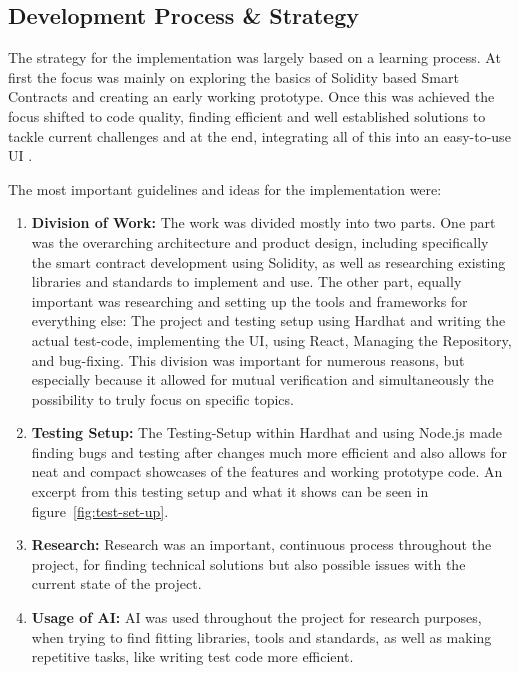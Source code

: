 \documentclass[11pt,a4paper]{article}
\begin{document}
	\subsection{Development Process \& Strategy}\label{subsec:dev-strategy}
	The strategy for the implementation was largely based on a learning process.
	At first the focus was mainly on exploring the basics of Solidity based Smart Contracts and creating an early working prototype.
	Once this was achieved the focus shifted to code quality, finding efficient and well established solutions to tackle current challenges and at the end, integrating all of this into an easy-to-use UI .


	The most important guidelines and ideas for the implementation were:

	\begin{enumerate}[1]
		\item \textbf{Division of Work:} The work was divided mostly into two parts.
			One part was the overarching architecture and product design, including specifically the smart contract development using Solidity, as well as researching existing libraries and standards to implement and use.
			The other part, equally important was researching and setting up the tools and frameworks for everything else: The project and testing setup using Hardhat and writing the actual test-code, implementing the UI, using React, Managing the Repository, and bug-fixing.
			This division was important for numerous reasons, but especially because it allowed for mutual verification and simultaneously the possibility to truly focus on specific topics.
		\item \textbf{Testing Setup:} The Testing-Setup within Hardhat and using Node.js made finding bugs and testing after changes much more efficient and also allows for neat and compact showcases of the features and working prototype code.
			An excerpt from this testing setup and what it shows can be seen in figure~\ref{fig:test-set-up}.
		\item \textbf{Research:} Research was an important, continuous process throughout the project, for finding technical solutions but also possible issues with the current state of the project.
		\item \textbf{Usage of AI:} AI was used throughout the project for research purposes, when trying to find fitting libraries, tools and standards, as well as making repetitive tasks, like writing test code more efficient.
	\end{enumerate}
\end{document}
